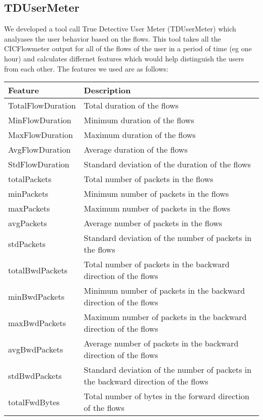 \subsection{TDUserMeter}
We developed a tool call True Detective User Meter (TDUserMeter) which analyases the user behavior based on the flows. This tool takes all the CICFlowmeter output for all of the flows of the user in a period of time (eg one hour) and calculates differnet features which would help distinguish the users from each other. The features we used are as follows:

\begin{table}[H]
\centering
\begin{tabular}{|l|l|}
\hline
\textbf{Feature} & \textbf{Description} \\ \hline
TotalFlowDuration & Total duration of the flows \\ \hline
MinFlowDuration & Minimum duration of the flows \\ \hline
MaxFlowDuration & Maximum duration of the flows \\ \hline
AvgFlowDuration & Average duration of the flows \\ \hline
StdFlowDuration & Standard deviation of the duration of the flows \\ \hline
totalPackets & Total number of packets in the flows \\ \hline
minPackets & Minimum number of packets in the flows \\ \hline
maxPackets & Maximum number of packets in the flows \\ \hline
avgPackets & Average number of packets in the flows \\ \hline
stdPackets & Standard deviation of the number of packets in the flows \\ \hline
totalBwdPackets & Total number of packets in the backward direction of the flows \\ \hline
minBwdPackets & Minimum number of packets in the backward direction of the flows \\ \hline
maxBwdPackets & Maximum number of packets in the backward direction of the flows \\ \hline
avgBwdPackets & Average number of packets in the backward direction of the flows \\ \hline
stdBwdPackets & Standard deviation of the number of packets in the backward direction of the flows \\ \hline
totalFwdBytes & Total number of bytes in the forward direction of the flows \\ \hline

\end{tabular}
\end{table}
